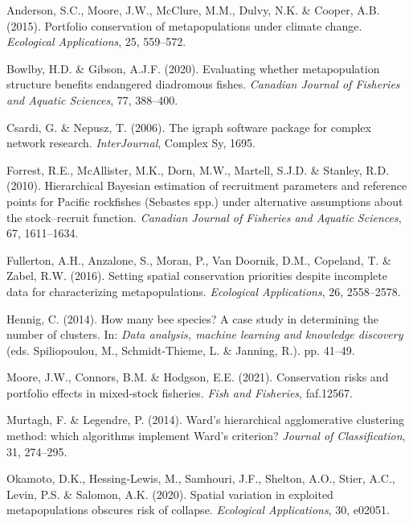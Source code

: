 \documentclass[
]{article}
\newlength{\cslhangindent}
\newlength{\cslentryspacingunit} %
\newenvironment{CSLReferences}[2] %
 {%
  \setlength{\parindent}{0pt}
  \ifodd #1
  \let\oldpar\par
  \def\par{\hangindent=\cslhangindent\oldpar}
  \fi
  \setlength{\parskip}{#2\cslentryspacingunit}
 }%
 {}
\begin{document}
\hypertarget{refs}{}
\begin{CSLReferences}{1}{0}
\leavevmode{}%
Anderson, S.C., Moore, J.W., McClure, M.M., Dulvy, N.K. \& Cooper, A.B.
(2015). {Portfolio conservation of metapopulations under climate
change.} \emph{Ecological Applications}, 25, 559--572.

\leavevmode{}%
Bowlby, H.D. \& Gibson, A.J.F. (2020). {Evaluating whether
metapopulation structure benefits endangered diadromous fishes}.
\emph{Canadian Journal of Fisheries and Aquatic Sciences}, 77, 388--400.

\leavevmode{}%
Csardi, G. \& Nepusz, T. (2006). {The igraph software package for
complex network research}. \emph{InterJournal}, Complex Sy, 1695.

\leavevmode{}%
Forrest, R.E., McAllister, M.K., Dorn, M.W., Martell, S.J.D. \& Stanley,
R.D. (2010). {Hierarchical Bayesian estimation of recruitment parameters
and reference points for Pacific rockfishes (Sebastes spp.) under
alternative assumptions about the stock--recruit function}.
\emph{Canadian Journal of Fisheries and Aquatic Sciences}, 67,
1611--1634.

\leavevmode{}%
Fullerton, A.H., Anzalone, S., Moran, P., Van Doornik, D.M., Copeland,
T. \& Zabel, R.W. (2016). {Setting spatial conservation priorities
despite incomplete data for characterizing metapopulations}.
\emph{Ecological Applications}, 26, 2558--2578.

\leavevmode{}%
Hennig, C. (2014). {How many bee species? A case study in determining
the number of clusters}. In: \emph{Data analysis, machine learning and
knowledge discovery} (eds. Spiliopoulou, M., Schmidt-Thieme, L. \&
Janning, R.). pp. 41--49.

\leavevmode{}%
Moore, J.W., Connors, B.M. \& Hodgson, E.E. (2021). {Conservation risks
and portfolio effects in mixed‐stock fisheries}. \emph{Fish and
Fisheries}, faf.12567.

\leavevmode{}%
Murtagh, F. \& Legendre, P. (2014). {Ward's hierarchical agglomerative
clustering method: which algorithms implement Ward's criterion?}
\emph{Journal of Classification}, 31, 274--295.

\leavevmode{}%
Okamoto, D.K., Hessing‐Lewis, M., Samhouri, J.F., Shelton, A.O., Stier,
A.C., Levin, P.S. \& Salomon, A.K. (2020). {Spatial variation in
exploited metapopulations obscures risk of collapse}. \emph{Ecological
Applications}, 30, e02051.


\end{CSLReferences}
\end{document}
